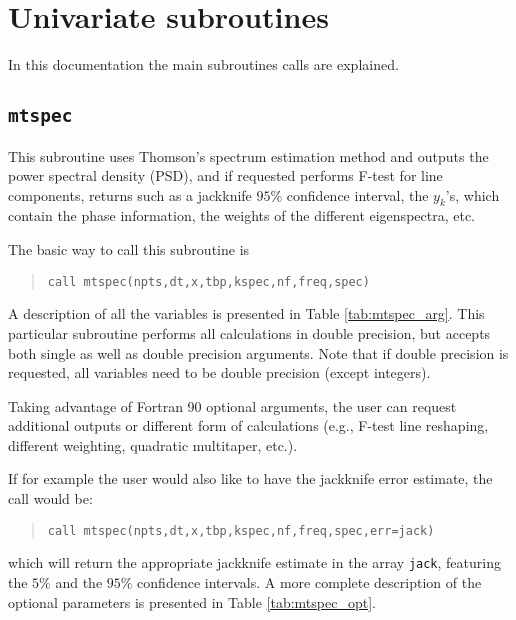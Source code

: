 \documentclass{article}
\begin{document}
\section{Univariate subroutines}
In this documentation the main subroutines calls are explained. 

\subsection{\texttt{mtspec}}
This subroutine uses Thomson's spectrum estimation method \citep{djt_82} and outputs the power spectral density (PSD), and if requested performs F-test for line components, returns such as a jackknife $95\%$ confidence interval, the $y_k$'s, which contain the phase information, the weights of the different eigenspectra, etc. 

The basic way to call this subroutine is
\begin{quote}
\begin{verbatim}
call mtspec(npts,dt,x,tbp,kspec,nf,freq,spec)
\end{verbatim}
\end{quote}
A description of all the variables is presented in Table \ref{tab:mtspec_arg}. This particular subroutine performs all calculations in double precision, but accepts both single as well as double precision arguments. Note that if double precision is requested, all variables need to be double precision (except integers).

Taking advantage of Fortran 90 optional arguments, the user can request additional outputs or different form of calculations (e.g., F-test line reshaping, different weighting, quadratic multitaper, etc.).

If for example the user would also like to have the jackknife error estimate, the  call would be:
\begin{quote}
\begin{verbatim}
call mtspec(npts,dt,x,tbp,kspec,nf,freq,spec,err=jack)
\end{verbatim}
\end{quote}
which will return the appropriate jackknife estimate in the array \texttt{jack}, featuring the $5\%$ and the $95\%$ confidence intervals. A more complete description of the optional parameters is presented in Table \ref{tab:mtspec_opt}. 
\end{document}
